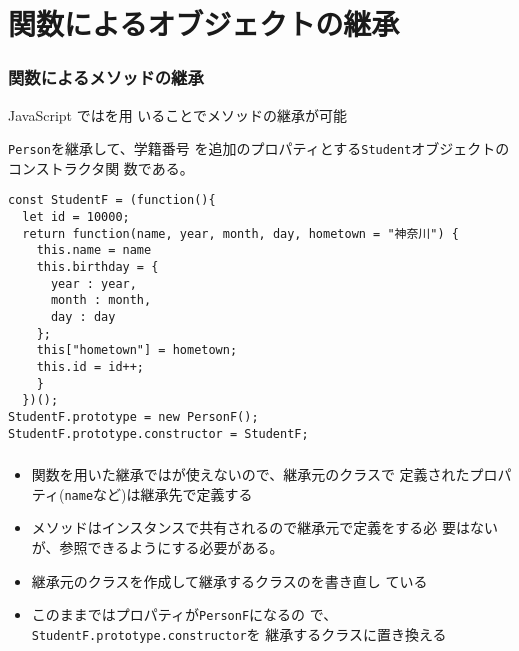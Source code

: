 \section{関数によるオブジェクトの継承}
\begin{frame}[containsverbatim]
 \frametitle{関数によるメソッドの継承}
 JavaScript ではを用
 いることでメソッドの継承が可能

 \texttt{Person}を継承して、学籍番号
 を追加のプロパティとする\texttt{Student}オブジェクトのコンストラクタ関
 数である。
 {\scriptsize
\begin{Verbatim}
const StudentF = (function(){
  let id = 10000;
  return function(name, year, month, day, hometown = "神奈川") {
    this.name = name
    this.birthday = {
      year : year,
      month : month,
      day : day
    };
    this["hometown"] = hometown;
    this.id = id++;
    }
  })();
StudentF.prototype = new PersonF();
StudentF.prototype.constructor = StudentF;
\end{Verbatim}
 }
\end{frame}
\begin{frame}[containsverbatim]
 \frametitle{}
 \begin{itemize}
 \item 関数を用いた継承ではが使えないので、継承元のクラスで
       定義されたプロパティ(\texttt{name}など)は継承先で定義する
 \item メソッドはインスタンスで共有されるので継承元で定義をする必
       要はないが、参照できるようにする必要がある。
  \item 継承元のクラスを作成して継承するクラスのを書き直し
       ている
 \item このままではプロパティが\texttt{PersonF}になるの
       で、\texttt{StudentF.prototype.constructor}を
       継承するクラスに置き換える
\end{itemize}
\end{frame}
